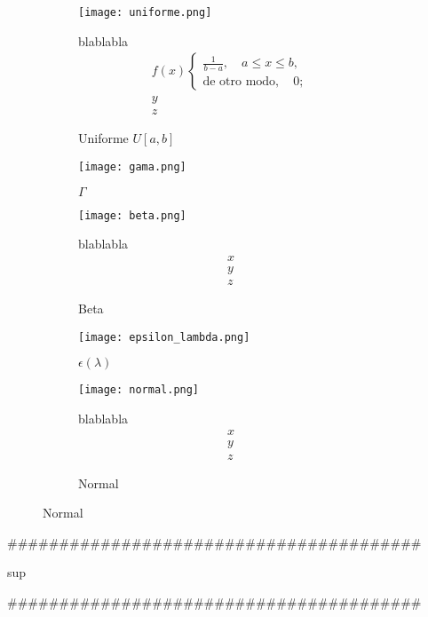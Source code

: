 \begin{figure}[H]
	\begin{subfigure}[t]{.5\textwidth}
		\texttt{[image: uniforme.png]}\caption{Uniforme $U[a,b]$}
		blablabla
		\begin{equation}
		\begin{matrix}
		f(x)\begin{cases}\frac{1}{b-a},\quad a\leq x\leq b,\\\text{de otro modo},\quad 0;\end{cases}\\
		y\\
		z
		\end{matrix}
		\end{equation}
	\end{subfigure}\qquad

	\begin{subfigure}[t]{.5\textwidth}
		\texttt{[image: gama.png]}
		\caption{$\Gamma$}
	\end{subfigure}

\begin{subfigure}[t]{.5\textwidth}\centering
		\texttt{[image: beta.png]}\caption{Beta}
		blablabla
		\begin{equation}
		\begin{matrix}
		x\\
		y\\
		z
		\end{matrix}
		\end{equation}
	\end{subfigure}

	\begin{subfigure}[t]{.5\textwidth}
		\texttt{[image: epsilon\_lambda.png]}\caption{$\epsilon(\lambda)$}
	\end{subfigure}

\begin{subfigure}[t]{.5\textwidth}
		\texttt{[image: normal.png]}\caption{Normal}
		blablabla
		\begin{equation}
		\begin{matrix}
		x\\
		y\\
		z
		\end{matrix}
		\end{equation}
	\end{subfigure}
\end{figure}
\#\#\#\#\#\#\#\#\#\#\#\#\#\#\#\#\#\#\#\#\#\#\#\#\#\#\#\#\#\#\#\#\#\#\#\#\#\#\#\#
\begin{center}sup\end{center}

\#\#\#\#\#\#\#\#\#\#\#\#\#\#\#\#\#\#\#\#\#\#\#\#\#\#\#\#\#\#\#\#\#\#\#\#\#\#\#\#\\